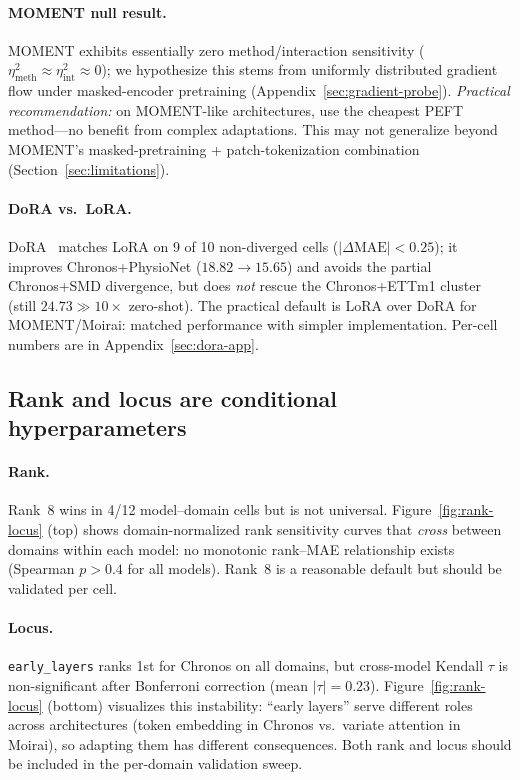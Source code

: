\documentclass{article}
\begin{document}
\paragraph{MOMENT null result.}
MOMENT exhibits essentially zero method/interaction sensitivity ($\eta^2_{\text{meth}} \approx \eta^2_{\text{int}} \approx 0$); we hypothesize this stems from uniformly distributed gradient flow under masked-encoder pretraining (Appendix~\ref{sec:gradient-probe}). \emph{Practical recommendation:} on MOMENT-like architectures, use the cheapest PEFT method---no benefit from complex adaptations. This may not generalize beyond MOMENT's masked-pretraining + patch-tokenization combination (Section~\ref{sec:limitations}).

\paragraph{DoRA vs.\ LoRA.} DoRA~\citep{dora2024} matches LoRA on 9 of 10 non-diverged cells ($|\Delta\text{MAE}| < 0.25$); it improves Chronos+PhysioNet ($18.82 \to 15.65$) and avoids the partial Chronos+SMD divergence, but does \emph{not} rescue the Chronos+ETTm1 cluster (still $24.73 \gg 10\times$ zero-shot). The practical default is LoRA over DoRA for MOMENT/Moirai: matched performance with simpler implementation. Per-cell numbers are in Appendix~\ref{sec:dora-app}.

\subsection{Rank and locus are conditional hyperparameters}
\label{sec:rank-locus}

\paragraph{Rank.} Rank~8 wins in 4/12 model--domain cells but is not universal. Figure~\ref{fig:rank-locus} (top) shows domain-normalized rank sensitivity curves that \emph{cross} between domains within each model: no monotonic rank--MAE relationship exists (Spearman $p > 0.4$ for all models). Rank~8 is a reasonable default but should be validated per cell.

\paragraph{Locus.} \texttt{early\_layers} ranks 1st for Chronos on all domains, but cross-model Kendall $\tau$ is non-significant after Bonferroni correction (mean $|\tau|{=}0.23$). Figure~\ref{fig:rank-locus} (bottom) visualizes this instability: ``early layers'' serve different roles across architectures (token embedding in Chronos vs.\ variate attention in Moirai), so adapting them has different consequences. Both rank and locus should be included in the per-domain validation sweep.
\end{document}
